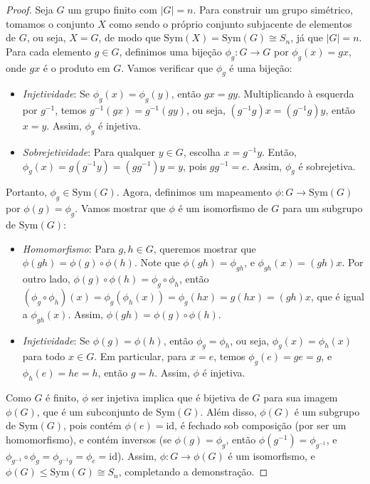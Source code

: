 \begin{proof}
  Seja $G$ um grupo finito com $|G| = n$.
  Para construir um grupo simétrico, tomamos o conjunto $X$ como sendo o
  próprio conjunto subjacente de elementos de $G$, ou seja, $X = G$, de modo
  que $\text{Sym}(X) = \text{Sym}(G) \cong S_n$, já que $|G| = n$.
  Para cada elemento $g \in G$,
  definimos uma bijeção $\phi_g: G \to G$ por $\phi_g(x) = g x$, onde $g x$ é o
  produto em $G$. Vamos verificar que $\phi_g$ é uma bijeção:
\begin{itemize}
    \item \emph{Injetividade}: Se $\phi_g(x) = \phi_g(y)$, então $g x = g y$.
      Multiplicando à esquerda por $g^{-1}$, temos $g^{-1}(g x) = g^{-1}(g y)$,
      ou seja, $(g^{-1} g) x = (g^{-1} g) y$, então $x = y$. Assim, $\phi_g$ é
      injetiva.
    \item \emph{Sobrejetividade}: Para qualquer $y \in G$, escolha $x = g^{-1}y$.
      Então, $\phi_g(x) = g (g^{-1} y) = (g g^{-1}) y = y$, pois $g g^{-1} = e$.
      Assim, $\phi_g$ é sobrejetiva.
\end{itemize}
  Portanto, $\phi_g \in \text{Sym}(G)$. Agora, definimos um mapeamento
  $\phi: G \to \text{Sym}(G)$ por $\phi(g) = \phi_g$. Vamos mostrar que $\phi$ é um
  isomorfismo de $G$ para um subgrupo de $\text{Sym}(G)$:
\begin{itemize}
    \item \emph{Homomorfismo}: Para $g, h \in G$, queremos mostrar que
      $\phi(g h) = \phi(g) \circ \phi(h)$. Note que $\phi(g h) = \phi_{g h}$, e
      $\phi_{g h}(x) = (g h) x$. Por outro lado, 
      $\phi(g) \circ \phi(h) = \phi_g \circ \phi_h$, então 
      $(\phi_g \circ \phi_h)(x) = \phi_g(\phi_h(x)) = \phi_g(h x) = g (h x) = (g h) x$,
      que é igual a $\phi_{g h}(x)$. Assim, $\phi(g h) = \phi(g) \circ \phi(h)$.
    \item \emph{Injetividade}: Se $\phi(g) = \phi(h)$, então $\phi_g = \phi_h$,
      ou seja, $\phi_g(x) = \phi_h(x)$ para todo $x \in G$. Em particular, para
      $x = e$, temos $\phi_g(e) = g e = g$, e $\phi_h(e) = h e = h$, então 
      $g = h$. Assim, $\phi$ é injetiva.
\end{itemize}
  Como $G$ é finito, $\phi$ ser injetiva implica que é bijetiva de $G$ para sua
  imagem $\phi(G)$, que é um subconjunto de $\text{Sym}(G)$. Além disso,
  $\phi(G)$ é um subgrupo de $\text{Sym}(G)$, pois contém $\phi(e) =
  \text{id}$, é fechado sob composição (por ser um homomorfismo), e contém
  inversos (se $\phi(g) = \phi_g$, então $\phi(g^{-1}) = \phi_{g^{-1}}$, e
  $\phi_{g^{-1}} \circ \phi_g = \phi_{g^{-1} g} = \phi_e = \text{id}$). Assim,
  $\phi: G \to \phi(G)$ é um isomorfismo, e $\phi(G) \leq \text{Sym}(G) \cong S_n$, 
  completando a demonstração.
\end{proof}

